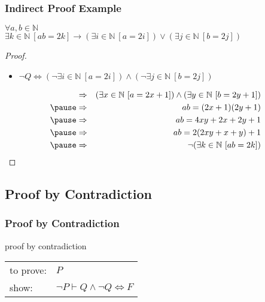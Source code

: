 \documentclass[dvipsnames]{beamer}
\begin{document}
\begin{frame}
  \frametitle{Indirect Proof Example}

  \begin{theorem}
    $\forall a,b \in \mathbb{N}$\\
      $\exists k \in \mathbb{N}~[ab=2k] \rightarrow
        (\exists i \in \mathbb{N}~[a=2i]) \vee
        (\exists j \in \mathbb{N}~[b=2j])$
  \end{theorem}

  \pause
  \begin{proof}
    \begin{itemize}
      \item $\neg Q \Leftrightarrow (\neg \exists i \in \mathbb{N}~[a=2i])
                          \wedge (\neg \exists j \in \mathbb{N}~[b=2j])$
    \end{itemize}

    \pause
    \vspace{-24pt}
    \begin{eqnarray*}
      & \Rightarrow & (\exists x \in \mathbb{N}~[a=2x+1])
               \wedge (\exists y \in \mathbb{N}~[b=2y+1])\\\pause
      & \Rightarrow & ab=(2x+1)(2y+1)\\\pause
      & \Rightarrow & ab=4xy+2x+2y+1\\\pause
      & \Rightarrow & ab=2(2xy+x+y)+1\\\pause
      & \Rightarrow & \neg (\exists k \in \mathbb{N}~[ab=2k])
    \end{eqnarray*}
  \end{proof}
\end{frame}

\subsection{Proof by Contradiction}

\begin{frame}
  \frametitle{Proof by Contradiction}

  \begin{block}{proof by contradiction}
    \begin{tabular}{ll}
      to prove: & $P$\\
      show:     & $\neg P \vdash Q \wedge \neg Q \Leftrightarrow F$
    \end{tabular}
  \end{block}
\end{frame}
\end{document}
